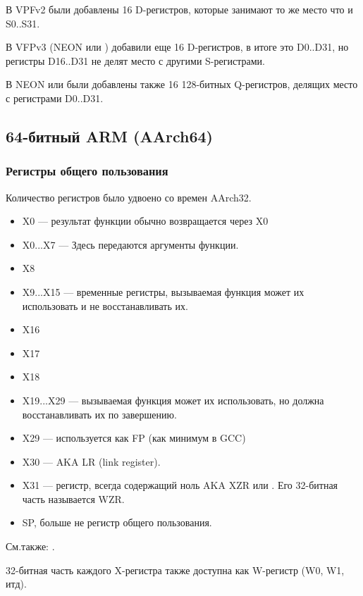 В VPFv2 были добавлены 16 D-регистров, которые занимают то же место что и S0..S31.

В VFPv3 (\gls{NEON} или ) добавили еще 16 D-регистров, в итоге это D0..D31, но регистры D16..D31 не делят место с другими S-регистрами.

В \gls{NEON} или  были добавлены также 16 128-битных Q-регистров, делящих место с регистрами D0..D31.

\subsection{64-битный ARM (AArch64)}

\subsubsection{Регистры общего пользования}
\label{ARM64_GPRs}

Количество регистров было удвоено со времен AArch32.

\begin{itemize}
	\item X0 --- результат функции обычно возвращается через X0
        \item X0...X7 --- Здесь передаются аргументы функции.
	\item X8
	\item X9...X15 --- временные регистры, вызываемая функция может их использовать и не восстанавливать их.
	\item X16
	\item X17
	\item X18
	\item X19...X29 --- вызываемая функция может их использовать, но должна восстанавливать их по завершению.
	\item X29 --- используется как \ac{FP} (как минимум в GCC)
	\item X30 ---  \ac{AKA} \ac{LR} (\gls{link register}).
	\item X31 --- регистр, всегда содержащий ноль \ac{AKA} XZR или . Его 32-битная часть называется WZR.
	\item \ac{SP}, больше не регистр общего пользования.
\end{itemize}

См.также: \ARMPCS.

32-битная часть каждого X-регистра также доступна как W-регистр (W0, W1, итд).


